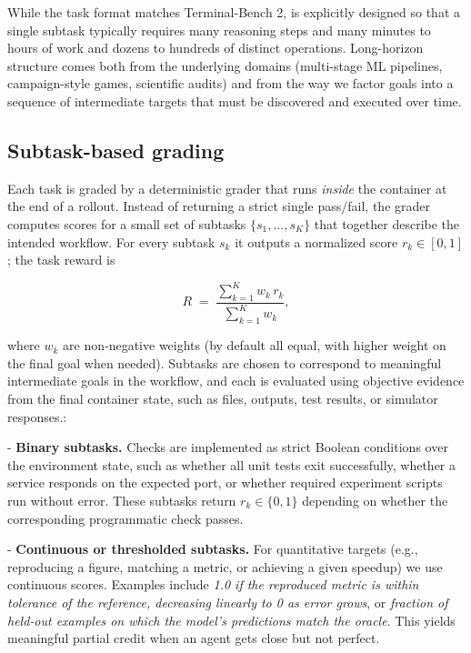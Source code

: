 While the task format matches Terminal-Bench 2, \ours{} is explicitly designed so that a single subtask typically requires many reasoning steps and many minutes to hours of work and dozens to hundreds of distinct operations.
%
Long-horizon structure comes both from the underlying domains (multi-stage ML pipelines, campaign-style games, scientific audits) and from the way we factor goals into a sequence of intermediate targets that must be discovered and executed over time.



\subsection{Subtask-based grading}

Each \ours{} task is graded by a deterministic grader that runs \emph{inside} the container at the end of a rollout.
Instead of returning a strict single pass/fail, the grader computes scores for a small set of subtasks
$\{s_1,\dots,s_K\}$ that together describe the intended workflow.
For every subtask $s_k$ it outputs a normalized score $r_k \in [0,1]$; the task reward is

\[
R \;=\; \frac{\sum_{k=1}^K w_k\, r_k}{\sum_{k=1}^K w_k},
\]

where $w_k$ are non‑negative weights (by default all equal, with higher weight on the final goal when needed).
%
Subtasks are chosen to correspond to meaningful intermediate goals in the workflow, and each is evaluated using objective evidence from the final container state, such as files, outputs, test results, or simulator responses.:

- \textbf{Binary subtasks.}
Checks are implemented as strict Boolean conditions over the environment state, such as whether all unit tests exit successfully, whether a service responds on the expected port, or whether required experiment scripts run without error.
These subtasks return $r_k \in \{0,1\}$ depending on whether the corresponding programmatic check passes.

- \textbf{Continuous or thresholded subtasks.}
  For quantitative targets (e.g., reproducing a figure, matching a metric, or achieving a given speedup) we use continuous scores.
  Examples include \textit{1.0 if the reproduced metric is within tolerance of the reference, decreasing linearly to 0 as error grows}, or \textit{fraction of held‑out examples on which the model’s predictions match the oracle}.
  This yields meaningful partial credit when an agent gets close but not perfect.

